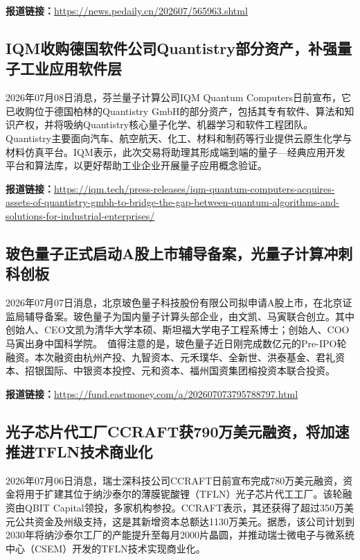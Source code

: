 \documentclass[12pt,a4paper]{ctexart}
\begin{document}
\noindent\textbf{报道链接：}\url{https://news.pedaily.cn/202607/565963.shtml}

\subsection{ IQM收购德国软件公司Quantistry部分资产，补强量子工业应用软件层 }

2026年07月08日消息，芬兰量子计算公司IQM Quantum Computers日前宣布，它已收购位于德国柏林的Quantistry GmbH的部分资产，包括其专有软件、算法和知识产权，并将吸纳Quantistry核心量子化学、机器学习和软件工程团队。Quantistry主要面向汽车、航空航天、化工、材料和制药等行业提供云原生化学与材料仿真平台。IQM表示，此次交易将助理其形成端到端的量子—经典应用开发平台和算法库，以更好帮助工业企业开展量子应用概念验证。

\noindent\textbf{报道链接：}\url{https://iqm.tech/press-releases/iqm-quantum-computers-acquires-assets-of-quantistry-gmbh-to-bridge-the-gap-between-quantum-algorithms-and-solutions-for-industrial-enterprises/}

\subsection{ 玻色量子正式启动A股上市辅导备案，光量子计算冲刺科创板 }

2026年07月07日消息，北京玻色量子科技股份有限公司拟申请A股上市，在北京证监局辅导备案。玻色量子为国内量子计算头部企业，由文凯、马寅联合创立。其中创始人、CEO文凯为清华大学本硕、斯坦福大学电子工程系博士；创始人、COO马寅出身中国科学院。　值得注意的是，玻色量子近日刚完成数亿元的Pre-IPO轮融资。本次融资由杭州产投、九智资本、元禾璞华、全新世、洪泰基金、君礼资本、招银国际、中银资本投控、元和资本、福州国资集团榕投资本联合投资。

\noindent\textbf{报道链接：}\url{https://fund.eastmoney.com/a/202607073795788797.html}

\subsection{ 光子芯片代工厂CCRAFT获790万美元融资，将加速推进TFLN技术商业化 }

2026年07月06日消息，瑞士深科技公司CCRAFT日前宣布完成780万美元融资，资金将用于扩建其位于纳沙泰尔的薄膜铌酸锂（TFLN）光子芯片代工工厂。该轮融资由QBIT Capital领投，多家机构参投。CCRAFT表示，其还获得了超过350万美元公共资金及州级支持，这是其新增资本总额达1130万美元。据悉，该公司计划到2030年将纳沙泰尔工厂的产能提升至每月2000片晶圆，并推动瑞士微电子与微系统中心（CSEM）开发的TFLN技术实现商业化。
\end{document}
